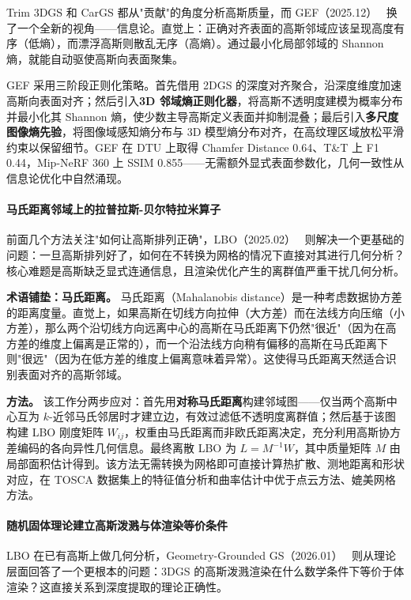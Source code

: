 Trim 3DGS 和 CarGS 都从"贡献"的角度分析高斯质量，而 GEF（2025.12）~\cite{2512_04542} 换了一个全新的视角——信息论。直觉上：正确对齐表面的高斯邻域应该呈现高度有序（低熵），而漂浮高斯则散乱无序（高熵）。通过最小化局部邻域的 Shannon 熵，就能自动驱使高斯向表面聚集。

GEF 采用三阶段正则化策略。首先借用 2DGS 的深度对齐聚合，沿深度维度加速高斯向表面对齐；然后引入\textbf{3D 邻域熵正则化器}，将高斯不透明度建模为概率分布并最小化其 Shannon 熵，使少数主导高斯定义表面并抑制混叠；最后引入\textbf{多尺度图像熵先验}，将图像域感知熵分布与 3D 模型熵分布对齐，在高纹理区域放松平滑约束以保留细节。GEF 在 DTU 上取得 Chamfer Distance 0.64、T\&T 上 F1 0.44，Mip-NeRF 360 上 SSIM 0.855——无需额外显式表面参数化，几何一致性从信息论优化中自然涌现。

\paragraph{马氏距离邻域上的拉普拉斯-贝尔特拉米算子}

前面几个方法关注"如何让高斯排列正确"，LBO（2025.02）~\cite{2502_17531} 则解决一个更基础的问题：一旦高斯排列好了，如何在不转换为网格的情况下直接对其进行几何分析？核心难题是高斯缺乏显式连通信息，且渲染优化产生的离群值严重干扰几何分析。

\textbf{术语铺垫：马氏距离。} 马氏距离（Mahalanobis distance）是一种考虑数据协方差的距离度量。直觉上，如果高斯在切线方向拉伸（大方差）而在法线方向压缩（小方差），那么两个沿切线方向远离中心的高斯在马氏距离下仍然"很近"（因为在高方差的维度上偏离是正常的），而一个沿法线方向稍有偏移的高斯在马氏距离下则"很远"（因为在低方差的维度上偏离意味着异常）。这使得马氏距离天然适合识别表面对齐的高斯邻域。

\textbf{方法。} 该工作分两步应对：首先用\textbf{对称马氏距离}构建邻域图——仅当两个高斯中心互为 $k$-近邻马氏邻居时才建立边，有效过滤低不透明度离群值；然后基于该图构建 LBO 刚度矩阵 $W_{ij}$，权重由马氏距离而非欧氏距离决定，充分利用高斯协方差编码的各向异性几何信息。最终离散 LBO 为 $L = M^{-1}W$，其中质量矩阵 $M$ 由局部面积估计得到。该方法无需转换为网格即可直接计算热扩散、测地距离和形状对应，在 TOSCA 数据集上的特征值分析和曲率估计中优于点云方法、媲美网格方法。

\paragraph{随机固体理论建立高斯泼溅与体渲染等价条件}

LBO 在已有高斯上做几何分析，Geometry-Grounded GS（2026.01）~\cite{2601_17835} 则从理论层面回答了一个更根本的问题：3DGS 的高斯泼溅渲染在什么数学条件下等价于体渲染？这直接关系到深度提取的理论正确性。

